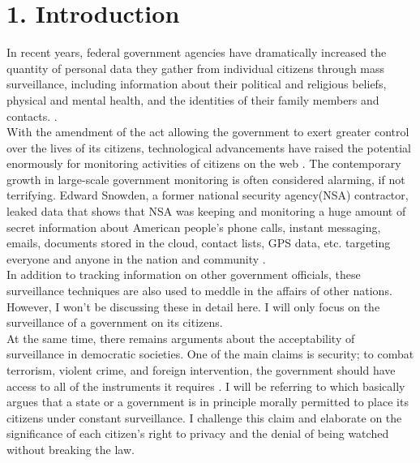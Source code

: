 \documentclass[11pt]{report}
\begin{document}
\section*{1. Introduction}
In recent years, federal government agencies have dramatically increased the quantity of personal data they gather from individual citizens through mass surveillance, including information about their political and religious beliefs, physical and mental health, and the identities of their family members and contacts. \cite{increase_in_surveillance}. \\
With the amendment of the act allowing the government to exert greater control over the lives of its citizens, technological advancements have raised the potential enormously for monitoring activities of citizens on the web \cite{govt_survellience}. The contemporary growth in large-scale government monitoring is often considered alarming, if not terrifying. Edward Snowden, a former national security agency(NSA) contractor, leaked data that shows that NSA was keeping and monitoring a huge amount of secret information about American people’s phone calls, instant messaging, emails, documents stored in the cloud, contact lists, GPS data, etc. targeting everyone and anyone in the nation and community \cite{snowden}.\\

In addition to tracking information on other government officials, these surveillance techniques are also used to meddle in the affairs of other nations. However, I won’t be discussing these in detail here. I will only focus on the surveillance of a government on its citizens.\\  

At the same time, there remains arguments about the acceptability of surveillance in democratic societies. One of the main claims is security; to combat terrorism, violent crime, and foreign intervention, the government should have access to all of the instruments it requires \cite{govt_take_on_survellience}\cite{tyler}. I will be referring to \cite{tyler} which basically argues that a state or a government is in principle morally permitted to place its citizens under constant surveillance. I challenge this claim and elaborate on the significance of each citizen's right to privacy and the denial of being watched without breaking the law.\\
\end{document}
